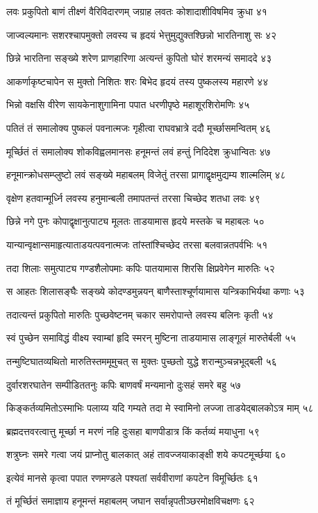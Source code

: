 लवः प्रकुपितो बाणं तीक्ष्णं वैरिविदारणम्
जग्राह लवतः कोशादाशीविषमिव क्रुधा ४१

जाज्वल्यमानः सशरश्चापमुक्तो लवस्य च
हृदयं भेत्तुमुद्युक्तश्छिन्नो भारतिनाशु सः ४२

छिन्ने भारतिना सङ्ख्ये शरेण प्राणहारिणा
अत्यन्तं कुपितो घोरं शरमन्यं समाददे ४३

आकर्णाकृष्टचापेन स मुक्तो निशितः शरः
बिभेद हृदयं तस्य पुष्कलस्य महारणे ४४

भिन्नो वक्षसि वीरेण सायकेनाशुगामिना
पपात धरणीपृष्ठे महाशूरशिरोमणिः ४५

पतितं तं समालोक्य पुष्कलं पवनात्मजः
गृहीत्वा राघवभ्रात्रे ददौ मूर्च्छासमन्वितम् ४६

मूर्च्छितं तं समालोक्य शोकविह्वलमानसः
हनूमन्तं लवं हन्तुं निदिदेश क्रुधान्वितः ४७

हनूमान्क्रोधसम्प्लुष्टो लवं सङ्ख्ये महाबलम्
विजेतुं तरसा प्रागाद्वृक्षमुद्यम्य शाल्मलिम् ४८

वृक्षेण हतवान्मूर्ध्नि लवस्य हनुमान्बली
तमापतन्तं तरसा चिच्छेद शतधा लवः ४९

छिन्ने नगे पुनः कोपाद्वृक्षानुत्पाट्य मूलतः
ताडयामास हृदये मस्तके च महाबलः ५०

यान्यान्वृक्षान्समाहृत्याताडयत्पवनात्मजः
तांस्तांश्चिच्छेद तरसा बलवान्नतपर्वभिः ५१

तदा शिलाः समुत्पाट्य गण्डशैलोपमाः कपिः
पातयामास शिरसि क्षिप्रवेगेन मारुतिः ५२

स आहतः शिलासङ्घैः सङ्ख्ये कोदण्डमुन्नयन्
बाणैस्ताश्चूर्णयामास यन्त्रिकाभिर्यथा कणाः ५३

तदात्यन्तं प्रकुपितो मारुतिः पुच्छवेष्टनम्
चकार समरोपान्ते लवस्य बलिनः कृती ५४

स्वं पुच्छेन समाविद्धं वीक्ष्य स्वाम्बां हृदि स्मरन्
मुष्टिना ताडयामास लाङ्गूलं मारुतेर्बली ५५

तन्मुष्टिघातव्यथितो मारुतिस्तममूमुचत्
स मुक्तः पुच्छतो युद्धे शरान्मुञ्चन्नभूद्बली ५६

दुर्वारशरघातेन सम्पीडिततनुः कपिः
बाणवर्षं मन्यमानो दुःसहं समरे बहु ५७

किङ्कर्तव्यमितोऽस्माभिः पलाय्य यदि गम्यते
तदा मे स्वामिनो लज्जा ताडयेद्बालकोऽत्र माम् ५८

ब्रह्मदत्तवरत्वात्तु मूर्च्छा न मरणं नहि
दुःसहा बाणपीडात्र किं कर्तव्यं मयाधुना ५९

शत्रुघ्नः समरे गत्वा जयं प्राप्नोतु बालकात्
अहं तावज्जयाकाङ्क्षी शये कपटमूर्च्छया ६०

इत्येवं मानसे कृत्वा पपात रणमण्डले
पश्यतां सर्ववीराणां कपटेन विमूर्च्छितः ६१

तं मूर्च्छितं समाज्ञाय हनूमन्तं महाबलम्
जघान सर्वान्नृपतीञ्छरमोक्षविचक्षणः ६२

